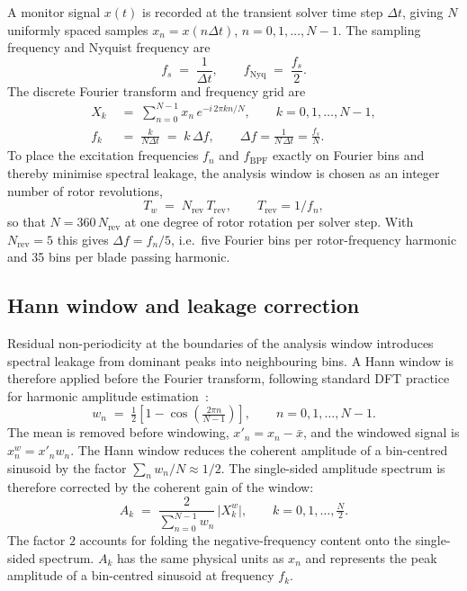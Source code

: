 A monitor signal $x(t)$ is recorded at the transient solver time step $\Delta t$, giving $N$ uniformly spaced samples $x_n = x(n\Delta t)$, $n = 0,1,\dots,N-1$. The sampling frequency and Nyquist frequency are
\begin{equation}
    f_s \;=\; \frac{1}{\Delta t},\qquad
    f_{\mathrm{Nyq}} \;=\; \frac{f_s}{2}. \label{eq:fs_fnyq}
\end{equation}
The discrete Fourier transform and frequency grid are
\begin{align}
    X_k &\;=\; \sum_{n=0}^{N-1} x_n\, e^{-i\,2\pi k n / N},
    \qquad k = 0,1,\dots,N-1, \label{eq:dft}\\
    f_k &\;=\; \frac{k}{N\Delta t} \;=\; k\,\Delta f,
    \qquad \Delta f = \frac{1}{N\,\Delta t} = \frac{f_s}{N}.
    \label{eq:dft_f}
\end{align}
To place the excitation frequencies $f_n$ and $f_{\mathrm{BPF}}$ exactly on Fourier bins and thereby minimise spectral leakage, the analysis window is chosen as an integer number of rotor revolutions,
\begin{equation}
    T_w \;=\; N_{\mathrm{rev}}\,T_{\mathrm{rev}},
    \qquad T_{\mathrm{rev}} = 1/f_n, \label{eq:Tw}
\end{equation}
so that $N = 360\,N_{\mathrm{rev}}$ at one degree of rotor rotation per solver step. With $N_{\mathrm{rev}}=5$ this gives $\Delta f = f_n/5$, i.e.\ five Fourier bins per rotor-frequency harmonic and 35 bins per blade passing harmonic.
 
\subsection{Hann window and leakage correction}
\label{sec:spec-window}

Residual non-periodicity at the boundaries of the analysis window introduces spectral leakage from dominant peaks into neighbouring bins. A Hann window is therefore applied before the Fourier transform, following standard DFT practice for harmonic amplitude estimation~\cite{Harris1978}:
\begin{equation}
    w_n \;=\; \tfrac{1}{2}\!\left[ 1 - \cos\!\left(\tfrac{2\pi n}{N-1}\right)\right],
    \qquad n = 0,1,\dots,N-1 .
    \label{eq:hanning}
\end{equation}
The mean is removed before windowing, \(x'_n = x_n - \bar{x}\), and the windowed signal is \(x^{w}_n = x'_n w_n\). The Hann window reduces the coherent amplitude of a bin-centred sinusoid by the factor \(\sum_n w_n/N \approx 1/2\). The single-sided amplitude spectrum is therefore corrected by the coherent gain of the window:
\begin{equation}
    A_k \;=\; \frac{2}{\displaystyle\sum_{n=0}^{N-1} w_n}\,
      \bigl|X^{w}_k\bigr|,
    \qquad k = 0,1,\dots,\tfrac{N}{2}.
    \label{eq:amplitude}
\end{equation}
The factor \(2\) accounts for folding the negative-frequency content onto the single-sided spectrum. \(A_k\) has the same physical units as \(x_n\) and represents the peak amplitude of a bin-centred sinusoid at frequency \(f_k\).
 
